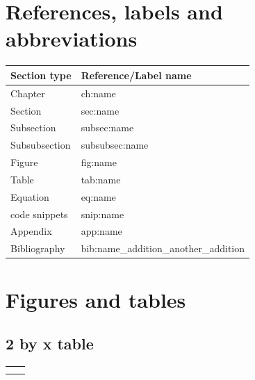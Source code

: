 


\section{References, labels and abbreviations}
\begin{table}[H]
\begin{tabular}{|l|l|}
\hline

Section type  & Reference/Label name \\ \hline
Chapter       & ch:name                  \\ \hline
Section       & sec:name                  \\ \hline
Subsection    & subsec:name               \\ \hline
Subsubsection & subsubsec:name           \\ \hline
Figure        & fig:name                  \\ \hline
Table         & tab:name                  \\ \hline
Equation      & eq:name                   \\ \hline
code snippets & snip:name                 \\ \hline
Appendix      & app:name                  \\ \hline
Bibliography  & bib:name\_addition\_another\_addition                \\ \hline
\end{tabular}
\end{table}
\section{Figures and tables}
\subsection{2 by x table}
\begin{table}[H]
\begin{tabular}{|l|l|}
\hline

        &       \\ \hline
        &       \\ \hline
        &       \\ \hline
\end{tabular}
\end{table}

